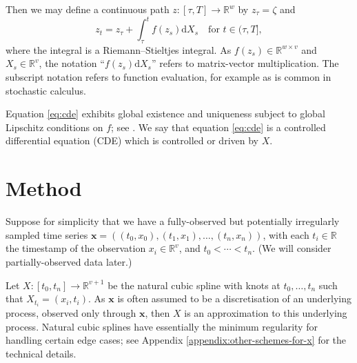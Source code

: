 \documentclass{article}
\theoremstyle{plain}
\theoremstyle{definition}
\newcommand{\reals}{\mathbb{R}}
\begin{document}
	Then we may define a continuous path $z \colon [\tau, T] \to \reals^w$ by $z_\tau = \zeta$ and
	\begin{equation}\label{eq:cde}
	z_t = z_\tau + \int_\tau^t f(z_s) \mathrm{d} X_s\quad\text{for $t \in (\tau, T]$},
	\end{equation}
	where the integral is a Riemann--Stieltjes integral. As $f(z_s) \in \reals^{w \times v}$ and $X_s \in \reals^v$, the notation ``$f(z_s) \mathrm{d}X_s$'' refers to matrix-vector multiplication. The subscript notation refers to function evaluation, for example as is common in stochastic calculus.
	
	Equation \eqref{eq:cde} exhibits global existence and uniqueness subject to global Lipschitz conditions on $f$; see \cite[Theorem 1.3]{levy-lyons}. We say that equation \eqref{eq:cde} is a controlled differential equation (CDE) which is controlled or driven by $X$.
	
	
	\section{Method}	
	Suppose for simplicity that we have a fully-observed but potentially irregularly sampled time series $\mathbf{x} = ((t_0, x_0), (t_1, x_1), \ldots, (t_n, x_n))$, with each $t_i \in \reals$ the timestamp of the observation $x_i \in \reals^v$, and $t_0 < \cdots < t_n$. (We will consider partially-observed data later.)
	
	Let $X \colon [t_0, t_n] \to \reals^{v + 1}$ be the natural cubic spline with knots at $t_0, \ldots, t_n$ such that $X_{t_i} = (x_i, t_i)$. As $\mathbf{x}$ is often assumed to be a discretisation of an underlying process, observed only through $\mathbf{x}$, then $X$ is an approximation to this underlying process. Natural cubic splines have essentially the minimum regularity for handling certain edge cases; see Appendix \ref{appendix:other-schemes-for-x} for the technical details.
		
\end{document}
